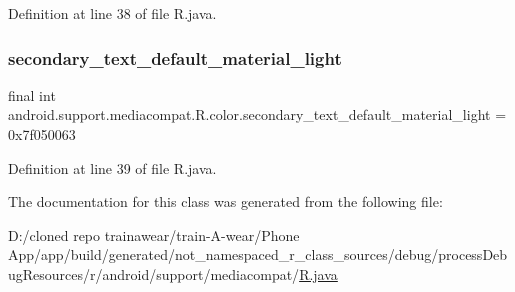 Definition at line 38 of file R.\+java.

\mbox{\label{classandroid_1_1support_1_1mediacompat_1_1_r_1_1color_a300f378d96501458fb9fd01e2f4ea7aa}} 
\subsubsection{\texorpdfstring{secondary\_text\_default\_material\_light}{secondary\_text\_default\_material\_light}}
{\footnotesize\ttfamily final int android.\+support.\+mediacompat.\+R.\+color.\+secondary\+\_\+text\+\_\+default\+\_\+material\+\_\+light = 0x7f050063\hspace{0.3cm}{\ttfamily [static]}}



Definition at line 39 of file R.\+java.



The documentation for this class was generated from the following file\+:\begin{DoxyCompactItemize}
\item 
D\+:/cloned repo trainawear/train-\/\+A-\/wear/\+Phone App/app/build/generated/not\+\_\+namespaced\+\_\+r\+\_\+class\+\_\+sources/debug/process\+Debug\+Resources/r/android/support/mediacompat/\mbox{\hyperlink{process_debug_resources_2r_2android_2support_2mediacompat_2_r_8java}{R.\+java}}\end{DoxyCompactItemize}
